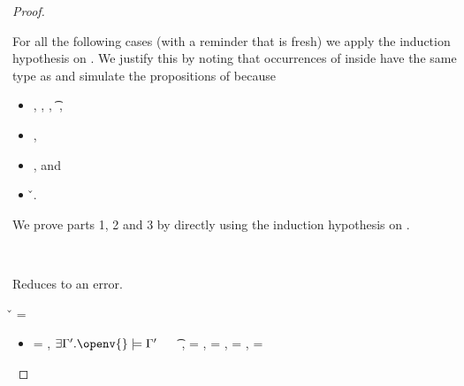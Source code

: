 \begin{lemma}
\begin{proof}
\begin{case}[B-Let]
\begin{itemize}
\begin{subcase}[T-Let]
        For all the following cases (with a reminder that \x{} is fresh)
        we apply the induction hypothesis on . We justify this by noting
        that occurrences of \x{} inside  have the same type as  and 
        simulate the propositions of 
        because 
        \begin{itemize}
          \item
  \judgementrewrite
       {\propenv{}, {\isprop {\s{}} {\x{}}},
         {\propp{}},
         {\proppp{}}}
             {} {\t{}} {\filterset {\thenprop {\prop{}}} {\elseprop {\prop{}}}}
             {\object{}} 
             {},
           \item
        ,
           \item
        {},
        and
           \item
         {} {\v{}}.
    \end{itemize}

        We prove parts 1, 2 and 3 by directly using the induction hypothesis on .
      \end{subcase}
  \end{itemize}
\end{case}

\begin{case}[BE-Let]
  \ 
  
  Reduces to an error.
\end{case}

\begin{case}[B-Abs] 
        \v{} = {\closure {\openv{}} {\abs {\x{}} {\s{}} {}}}

  \begin{itemize}
    \item[]
      \begin{subcase}[T-Clos]
  \ep{} = {\closure {\openv{}} {\abs {\x{}} {\s{}} {}}},
  $\exists {\propenvp{}}. \satisfies{\openv{}}{\propenvp{}}$
  \ \ 
\judgementrewrite {\propenvp{}} {\abs {\x{}} {\s{}} {}} {\t{}}
                 {\filterset {\thenprop {\prop{f}}}
                             {}}
                 {}
                 {\abs {\x{}} {\s{}} {}},
  \e{} = {\closure {\openv{}} {\abs {\x{}} {\s{}} {}}},
                 {\thenprop{\prop{}}} = \topprop{},
                 {\elseprop{\prop{}}} = \botprop{},
                 {\object{}} = \emptyobject{}


\end{subcase}
\end{itemize}
\end{case}
\end{proof}
\end{lemma}
